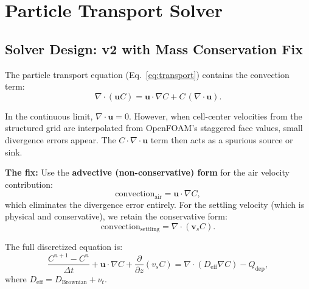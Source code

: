 \documentclass[12pt]{article}
\begin{document}
\section{Particle Transport Solver}

\subsection{Solver Design: v2 with Mass Conservation Fix}

The particle transport equation (Eq.~\ref{eq:transport}) contains the convection term:
\begin{equation}
    \nabla \cdot(\mathbf{u} C) = \mathbf{u} \cdot \nabla C + C \, (\nabla \cdot \mathbf{u}).
\end{equation}

In the continuous limit, $\nabla \cdot \mathbf{u} = 0$. However, when cell-center velocities from the structured grid are interpolated from OpenFOAM's staggered face values, small divergence errors appear. The $C \cdot \nabla \cdot \mathbf{u}$ term then acts as a spurious source or sink.

\textbf{The fix:} Use the \textbf{advective (non-conservative) form} for the air velocity contribution:
\begin{equation}
    \text{convection}_{\text{air}} = \mathbf{u} \cdot \nabla C, \label{eq:advective}
\end{equation}
which eliminates the divergence error entirely. For the settling velocity (which is physical and conservative), we retain the conservative form:
\begin{equation}
    \text{convection}_{\text{settling}} = \nabla \cdot (\mathbf{v}_s C). \label{eq:settling_cons}
\end{equation}

The full discretized equation is:
\begin{equation}
    \frac{C^{n+1} - C^n}{\Delta t} + \mathbf{u} \cdot \nabla C + \frac{\partial}{\partial z}(v_s C) = \nabla \cdot (D_\text{eff} \nabla C) - Q_\text{dep}, \label{eq:discrete}
\end{equation}
where $D_\text{eff} = D_\text{Brownian} + \nu_t$.

\end{document}

